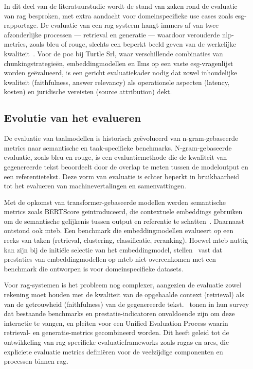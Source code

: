 In dit deel van de literatuurstudie wordt de stand van zaken rond de evaluatie van \gls{rag} besproken, met extra aandacht voor domeinspecifieke use cases zoals \gls{esg}-rapportage. De evaluatie van een \gls{rag}-systeem hangt immers af van twee afzonderlijke processen — retrieval en generatie — waardoor verouderde \gls{nlp}-metrics, zoals \gls{bleu} of \gls{rouge}, slechts een beperkt beeld geven van de werkelijke kwaliteit~\autocite{Yu2024}. Voor de \gls{poc} bij Turtle Srl, waar verschillende combinaties van chunkingstrategieën, embeddingmodellen en \glspl{llm} op een vaste \gls{esg}-vragenlijst worden geëvalueerd, is een gericht evaluatiekader nodig dat zowel inhoudelijke kwaliteit (faithfulness, answer relevancy) als operationele aspecten (latency, kosten) en juridische vereisten (source attribution) dekt.

\subsection{Evolutie van het evalueren}

De evaluatie van taalmodellen is historisch geëvolueerd van n-gram-gebaseerde metrics naar semantische en taak-specifieke benchmarks. N-gram-gebaseerde evaluatie, zoals \gls{bleu} en \gls{rouge}, is een evaluatiemethode die de kwaliteit van gegenereerde tekst beoordeelt door de overlap te meten tussen de modeloutput en een referentietekst. Deze vorm van evaluatie is echter beperkt in bruikbaarheid tot het evalueren van machinevertalingen en samenvattingen.

Met de opkomst van transformer-gebaseerde modellen werden semantische metrics zoals BERTScore geïntroduceerd, die contextuele embeddings gebruiken om de semantische gelijkenis tussen output en referentie te schatten~\autocite{Zhang2019,Devlin2019}. Daarnaast ontstond ook \gls{mteb}. Een benchmark die embeddingmodellen evalueert op een reeks van taken (retrieval, clustering, classificatie, reranking). Hoewel \gls{mteb} nuttig kan zijn bij de initiële selectie van het embeddingmodel, stellen~\textcite{Tang2024} vast dat prestaties van embeddingmodellen op \gls{mteb} niet overeenkomen met een benchmark die ontworpen is voor domeinspecifieke datasets.

Voor \gls{rag}-systemen is het probleem nog complexer, aangezien de evaluatie zowel rekening moet houden met de kwaliteit van de opgehaalde context (retrieval) als van de getrouwheid (faithfulness) van de gegenereerde tekst.~\textcite{Yu2024} tonen in hun survey dat bestaande benchmarks en prestatie-indicatoren onvoldoende zijn om deze interactie te vangen, en pleiten voor een Unified Evaluation Process waarin retrieval- en generatie-metrics gecombineerd worden. Dit heeft geleid tot de ontwikkeling van \gls{rag}-specifieke evaluatieframeworks zoals \gls{ragas} en \gls{ares}, die expliciete evaluatie metrics definiëren voor de veelzijdige componenten en processen binnen \gls{rag}.


